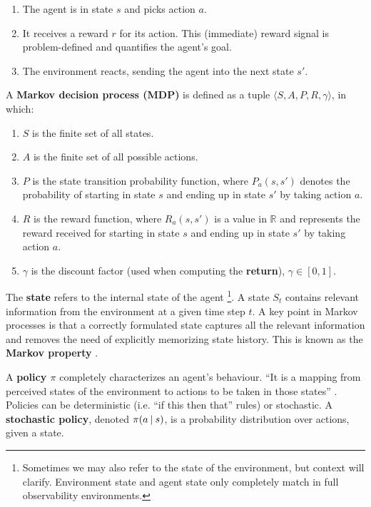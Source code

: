 \begin{enumerate}
    \item The agent is in state \(s\) and picks action \(a\).
    \item It receives a reward \(r\) for its action. This (immediate) reward signal is problem-defined and quantifies the agent’s goal.
    \item The environment reacts, sending the agent into the next state \(s'\).
\end{enumerate}

A \textbf{Markov decision process (MDP)} is defined as a tuple \(\langle S, A, P, R, \gamma \rangle\), in which:
\begin{enumerate}
    \item \(S\) is the finite set of all states.
    \item \(A\) is the finite set of all possible actions.
    \item \(P\) is the state transition probability function, where \(P_a(s, s')\) denotes the probability of starting in state \(s\) and ending up in state \(s'\) by taking action \(a\).
    \item \(R\) is the reward function, where \(R_a(s, s')\) is a value in \(\mathbb{R}\) and represents the reward received for starting in state \(s\) and ending up in state \(s'\) by taking action \(a\).
    \item \(\gamma\) is the discount factor (used when computing the \textbf{return}), \(\gamma \in [0, 1]\).
\end{enumerate}

The \textbf{state} refers to the internal state of the agent \footnote{Sometimes we may also refer to the state of the environment, but context will clarify. Environment state and agent state only completely match in full observability environments.}.
A state \(S_t\) contains relevant information from the environment at a given time step \(t\).
A key point in Markov processes is that a correctly formulated state captures all the relevant information and removes the need of explicitly memorizing state history.
This is known as the \textbf{Markov property} \cite{silver-lectures}.

A \textbf{policy \(\pi\)} completely characterizes an agent’s behaviour.
``It is a mapping from perceived states of the environment to actions to be taken in those states'' \cite{rlai}.
Policies can be deterministic (i.e. ``if this then that'' rules) or stochastic.
A \textbf{stochastic policy}, denoted \(\pi(a \:\vert\: s)\), is a probability distribution over actions, given a state.

